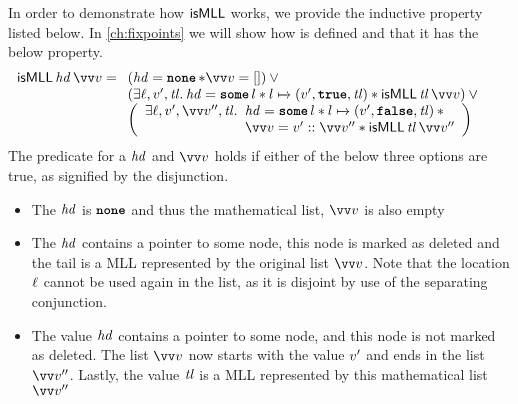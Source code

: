 \documentclass[thesis.tex]{subfiles}
\begin{document}
In order to demonstrate how $\textsf{\upshape isMLL}$ works, we provide the inductive property listed below. In \cref{ch:fixpoints} we will show how \isMLL is defined and that it has the below property.
\begin{align*}
    \isMLL\, \hd\, \vect{\val} & =
    \isMLLRecDef
\end{align*}
The predicate \isMLL for a $\mathit{hd}$ and $\vect{\val}$ holds if either of the below three options are true, as signified by the disjunction.
\begin{itemize}
    \item The $\mathit{hd}$ is $\operatorname{\texttt{\upshape \bfseries none}}$ and thus the mathematical list, $\vect{\val}$ is also empty
    \item The $\mathit{hd}$ contains a pointer to some node, this node is marked as deleted and the tail is a MLL represented by the original list $\vect{\val}$. Note that the location $\ell$ cannot be used again in the list, as it is disjoint by use of the separating conjunction.
    \item The value $\mathit{hd}$ contains a pointer to some node, and this node is not marked as deleted. The list $\vect{\val}$ now starts with the value $v'$ and ends in the list $\vect{\val}''$. Lastly, the value $\mathit{tl}$ is a MLL represented by this mathematical list $\vect{\val}''$
\end{itemize}
\end{document}

